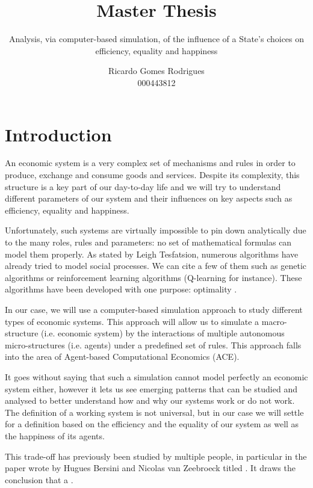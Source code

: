 \documentclass[12pt]{article}
\title{Master Thesis}
\subtitle{Analysis, via computer-based simulation, of the influence of a State's choices on efficiency, equality and happiness}
\author{Ricardo Gomes Rodrigues\\000443812}
\begin{document}
\maketitle
\newpage

\tableofcontents
\newpage


\section{Introduction}

An economic system is a very complex set of mechanisms and rules in order to produce, exchange and consume goods and services. Despite its complexity, this structure is a key part of our day-to-day life and we will try to understand different parameters of our system and their influences on key aspects such as efficiency, equality and happiness.

Unfortunately, such systems are virtually impossible to pin down analytically due to the many roles, rules and parameters: no set of mathematical formulas can model them properly. %
As stated by Leigh Tesfatsion, numerous algorithms have already tried to model social processes. We can cite a few of them such as genetic algorithms or reinforcement learning algorithms (Q-learning for instance). These algorithms have been developed with one purpose: optimality \cite{tesfatsion_bottom_up}.

In our case, we will use a computer-based simulation approach to study different types of economic systems. This approach will allow us to simulate a macro-structure (i.e. economic system) by the interactions of multiple autonomous micro-structures (i.e. agents) under a predefined set of rules. This approach falls into the area of Agent-based Computational Economics (ACE).

It goes without saying that such a simulation cannot model perfectly an economic system either, however it lets us see emerging patterns that can be studied and analysed to better understand how and why our systems work or do not work. The definition of a working system is not universal, but in our case we will settle for a definition based on the efficiency and the equality of our system as well as the happiness of its agents. 

This trade-off has previously been studied by multiple people, in particular in the paper wrote by Hugues Bersini and Nicolas van Zeebroeck titled  \cite{bersini}. It draws the conclusion that a .
\end{document}
